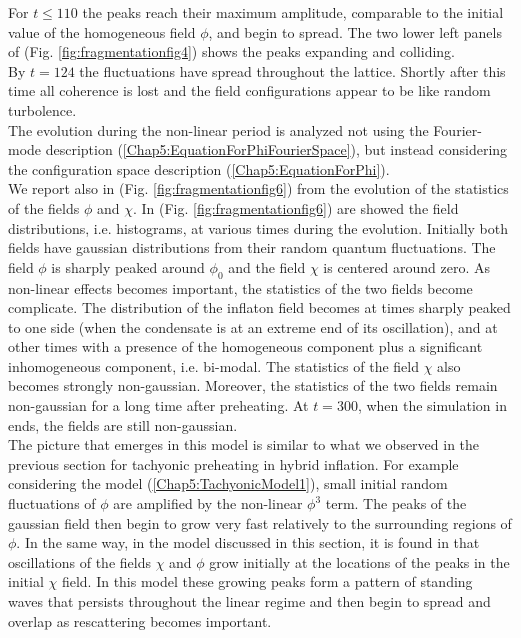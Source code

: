 \documentclass[11pt,a4paper,twoside]{book}
\begin{document}
For $ t \le 110 $ the peaks reach their maximum amplitude, comparable to the initial value of the homogeneous field $\phi$, and begin to spread. The two lower left panels of (Fig. \ref{fig:fragmentationfig4})  shows the peaks expanding and colliding.\\
By $ t=124 $ the fluctuations have spread throughout the lattice. Shortly after this time all coherence is lost and the field configurations appear to be like random turbolence.\\
The evolution during the non-linear period is analyzed not using the Fourier-mode description (\ref{Chap5:EquationForPhiFourierSpace}), but instead considering the configuration space description (\ref{Chap5:EquationForPhi}).\\
We report also in (Fig. \ref{fig:fragmentationfig6}) from \cite{Chap5:Fragmentation} the evolution of the statistics of the fields $\phi$ and $\chi$. In (Fig. \ref{fig:fragmentationfig6})  are showed the field distributions, i.e. histograms, at various times during the evolution. Initially both fields have gaussian distributions from their random quantum fluctuations. The field $\phi$ is sharply peaked around $\phi_{0}$ and the field $\chi$ is centered around zero. As non-linear effects becomes important, the statistics of the two fields become complicate. The distribution  of the inflaton field becomes at times sharply peaked to one side (when the condensate is at an extreme end of its oscillation), and at other times with a presence of the homogeneous component plus a significant inhomogeneous component, i.e. bi-modal. The statistics of the field $\chi$ also becomes strongly non-gaussian. Moreover, the statistics of the two fields remain non-gaussian for a long time after preheating. At $ t=300 $, when the simulation in \cite{Chap5:Fragmentation} ends, the fields are still non-gaussian.\\
The picture that emerges in this model is similar to what we observed in the previous section for tachyonic preheating in hybrid inflation.  For example considering the model (\ref{Chap5:TachyonicModel1}), small initial random fluctuations of $\phi$ are amplified by the non-linear $\phi^{3}$ term. The peaks of the gaussian field then begin to grow very fast relatively to the surrounding regions of $\phi$. In the same way, in the model discussed in this section, it is found in \cite{Chap5:Fragmentation} that oscillations of the fields $\chi$ and $\phi$ grow initially at the locations of the peaks in the initial $\chi$ field. In this model these growing peaks form a pattern of standing waves that persists throughout the linear regime and then begin to spread and overlap as rescattering becomes important.\\
\end{document}
